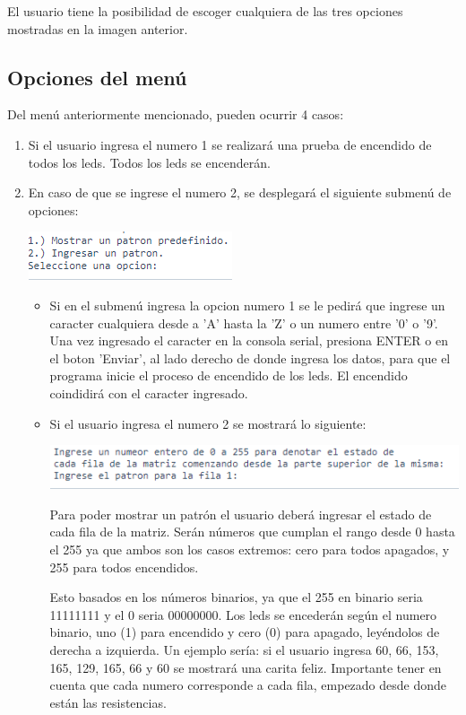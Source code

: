 \documentclass{article}
\begin{document}
El usuario tiene la posibilidad de escoger cualquiera de las tres opciones mostradas en  la imagen anterior. 

\subsection{Opciones del menú}
Del menú anteriormente mencionado, pueden ocurrir 4 casos:

\begin{enumerate}
    \item 
    Si el usuario ingresa el numero 1 se realizará una prueba de encendido de todos los leds. Todos los leds se encenderán. 
    \item
    En caso de que se ingrese el numero 2, se desplegará el siguiente submenú de opciones:
    
    \includegraphics[scale=1]{images/Submenu.png}
    \begin{itemize}
        \item 
        Si en el submenú ingresa la opcion numero 1 se le pedirá que ingrese un caracter cualquiera desde a 'A' hasta la 'Z' o un numero entre '0' o '9'. 
        Una vez ingresado el caracter en la consola serial, presiona ENTER o en el boton 'Enviar', al lado derecho de donde ingresa los datos, para que el programa inicie el proceso de encendido de los leds. 
        El encendido coindidirá con el caracter ingresado.
        \item
        Si el usuario ingresa el numero 2 se mostrará lo siguiente:
        
        \includegraphics[scale=0.9]{images/SubMenuOpc2.png}
        
        Para poder mostrar un patrón el usuario deberá ingresar el estado de cada fila de la matriz. Serán números que cumplan el rango desde 0 hasta el 255 ya que ambos son los casos extremos: cero para todos apagados, y 255 para todos encendidos. 
        \newline
        
        Esto basados en los números binarios, ya que el 255 en binario seria 11111111 y el 0 seria 00000000. Los leds se encederán según el numero binario, uno (1) para encendido y cero (0) para apagado, leyéndolos de derecha a izquierda. 
        Un ejemplo sería: 
        si el usuario ingresa 60, 66, 153, 165, 129, 165, 66 y 60 se mostrará una carita feliz. Importante tener en cuenta que cada numero corresponde a cada fila, empezado desde donde están las resistencias. 
        \newline
        

\end{itemize}
\end{enumerate}
\end{document}
